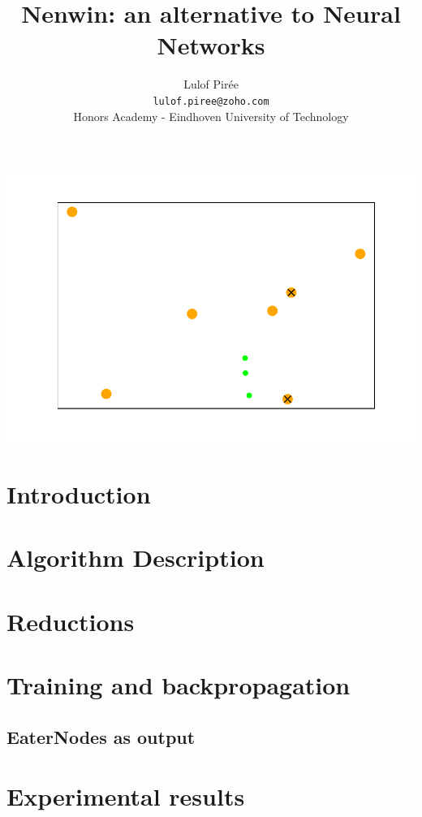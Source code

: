 \documentclass{scrartcl}
\title{Nenwin: an alternative to Neural Networks}
\author{Lulof Pirée\\\footnotesize\texttt{lulof.piree@zoho.com}\\\small{Honors Academy - Eindhoven University of Technology}\\}
\begin{document}
    \maketitle
    
    \includegraphics{teaser.pdf}
    \newpage
    
    \tableofcontents
    \newpage
    
    \section{Introduction}
    
    
    \section{Algorithm Description}
        
    
    \section{Reductions}
    
    
    \section{Training and backpropagation}
    
    
    \subsection{EaterNodes as output}
    
    
    \section{Experimental results}
    
    
\end{document}
